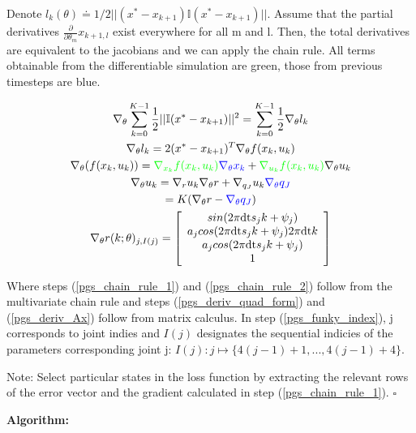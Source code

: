 \documentclass{article}
\begin{document}
Denote $l_k(\theta) \doteq 1/2 ||(x^* - x_{k+1}) \mathbb{I} (x^* - x_{k+1})||$. Assume that the partial derivatives $\frac{\partial}{\partial \theta_m} x_{k+1, l}$ exist everywhere for all m and l. Then, the total derivatives are equivalent to the jacobians and we can apply the chain rule. All terms obtainable from the differentiable simulation are green, those from previous timesteps are blue.

\begin{gather}
    \nabla_\theta \sum_{k=0}^{K-1} \frac{1}{2} || \mathbb{I}(x^* - x_{k+1}) ||^2 = \sum_{k=0}^{K-1} \frac{1}{2} \nabla_\theta l_k \\
    \nabla_\theta l_k = 2(x^* - x_{k+1})^T \nabla_\theta f(x_k, u_k)
    \label{pgs_deriv_quad_form}\\
    \nabla_\theta (f(x_k, u_k)) = \textcolor{green}{\nabla_{x_k} f(x_k,u_k)} \textcolor{blue}{\nabla_\theta x_k} + \textcolor{green}{\nabla_{u_k} f(x_k, u_k)} \nabla_\theta u_k
    \label{pgs_chain_rule_1}\\
    \nabla_\theta u_k = \nabla_r u_k \nabla_\theta r + \nabla_{q_J} u_k \textcolor{blue}{\nabla_\theta q_J}
    \label{pgs_chain_rule_2}\\
    = K (\nabla_\theta r - \textcolor{blue}{\nabla_\theta q_J})
    \label{pgs_deriv_Ax}\\
    \nabla_\theta r(k; \theta)_{j, I(j)} = \left[ \begin{array}{c} sin(2\pi \mbox{dt} s_j k + \psi_j) \\ a_j cos(2\pi \mbox{\mbox{dt}} s_j k + \psi_j) 2\pi \mbox{\mbox{dt}} k \\ a_j cos(2\pi \mbox{\mbox{dt}} s_j k + \psi_j) \\ 1 \end{array} \right]
    \label{pgs_funky_index}
\end{gather}

Where steps (\ref{pgs_chain_rule_1}) and (\ref{pgs_chain_rule_2}) follow from the multivariate chain rule and steps (\ref{pgs_deriv_quad_form}) and (\ref{pgs_deriv_Ax}) follow from matrix calculus. In step (\ref{pgs_funky_index}), j corresponds to joint indies and $I(j)$ designates the sequential indicies of the parameters corresponding joint j: $I(j): j \mapsto \{ 4(j-1) + 1, ...,4(j-1) + 4 \}$.

Note: Select particular states in the loss function by extracting the relevant rows of the error vector and the gradient calculated in step (\ref{pgs_chain_rule_1}). $\square$

\textbf{Algorithm: }
\end{document}
